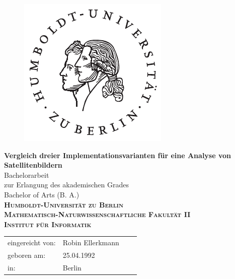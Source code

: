 \begin{titlepage}
\hspace{20cm}
\vspace{-2cm}

\begin{figure}[H] \hspace{10cm}
\includegraphics[width=2.2 cm]{picture/husiegel}
\end{figure}

\begin{center}
  \vspace{0.5 cm}
  \huge{\bf Vergleich dreier Implementationsvarianten für eine Analyse von Satellitenbildern } \\ %
  \vspace{1.5cm}
  \LARGE  Bachelorarbeit \\ %
  \vspace{1cm}
  \Large zur Erlangung des akademischen Grades \\
  Bachelor of Arts (B. A.) \\ %
  \vspace{2cm}
  {\large
    \bf{
      \scshape
      Humboldt-Universit\"at zu Berlin \\
      Mathematisch-Naturwissenschaftliche Fakult\"at II \\
      Institut f\"ur Informatik\\
    }
  } 
\end{center}
\vspace{5 cm}
{\large
  \begin{tabular}{llll}
    eingereicht von:    & Robin Ellerkmann && \\ %
    geboren am:         & 25.04.1992 && \\
    in:                 & Berlin && \\

\end{tabular}}
\end{titlepage}
